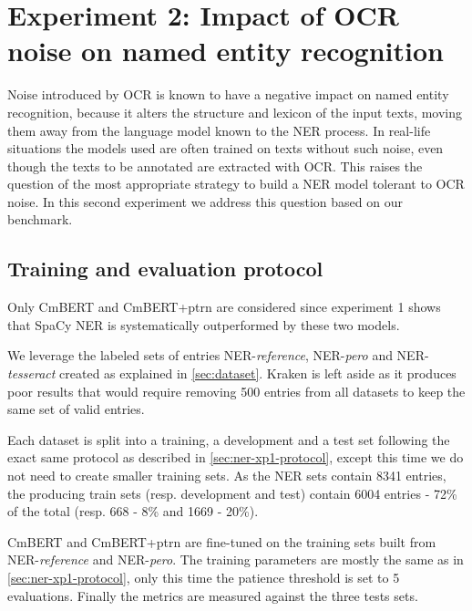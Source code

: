 \section{Experiment 2: Impact of OCR noise on named entity recognition}
\label{sec:ner-xp2}
Noise introduced by OCR is known to have a negative impact on named entity recognition, because it alters the structure and lexicon of the input texts, moving them away from the language model known to the NER process.
In real-life situations the models used are often trained on texts without such noise, even though the texts to be annotated are extracted with OCR.
This raises the question of the most appropriate strategy to build a NER model tolerant to OCR noise.
In this second experiment we address this question based on our benchmark.


\subsection{Training and evaluation protocol}
Only CmBERT and CmBERT+ptrn are considered since experiment 1 shows that SpaCy NER is systematically outperformed by these two models.

We leverage the labeled sets of entries NER-\emph{reference}, NER-\emph{pero} and NER-\emph{tesseract} created as explained in \cref{sec:dataset}.
Kraken is left aside as it produces poor results that would require removing 500 entries from all datasets to keep the same set of valid entries.

Each dataset is split into a training, a development and a test set following the exact same protocol as described in \cref{sec:ner-xp1-protocol}, except this time we do not need to create smaller training sets.
As the NER sets contain 8341 entries, the producing train sets (resp. development and test) contain 6004 entries - 72\% of the total (resp. 668 - 8\% and 1669 - 20\%).    

CmBERT and CmBERT+ptrn are fine-tuned on the training sets built from NER-\emph{reference} and NER-\emph{pero}.
The training parameters are mostly the same as in \cref{sec:ner-xp1-protocol}, only this time the patience threshold is set to 5 evaluations.
Finally the metrics are measured against the three tests sets.





